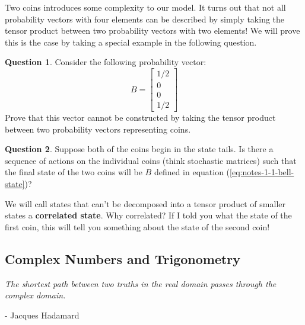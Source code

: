 \documentclass[letterpaper, 12pt]{article}
\newcommand{\1}{\mathds{1}}	%
\theoremstyle{definition}
\newtheorem{question}{Question}
\begin{document}
\newpage 
Two coins introduces some complexity to our model. It turns out that not all probability vectors with four elements can be described by simply taking the tensor product between two probability vectors with two elements! We will prove this is the case by taking a special example in the following question.  

\begin{question}
    Consider the following probability vector:
    \begin{equation}\label{eq:notes-1-1-bell-state}
        B = \begin{bmatrix}
            1/2 \\ 0 \\ 0 \\ 1/2
        \end{bmatrix}
    \end{equation}
    Prove that this vector cannot be constructed by taking the tensor product between two probability vectors representing coins. 
\end{question}
\vspace{50mm} %


\begin{question}
    Suppose both of the coins begin in the state tails. Is there a sequence of actions on the individual coins (think stochastic matrices) such that the final state of the two coins will be $B$ defined in equation (\ref{eq:notes-1-1-bell-state})? 
\end{question}
\vspace{50mm} %

We will call states that can't be decomposed into a tensor product of smaller states a \textbf{correlated state}. Why correlated? If I told you what the state of the first coin, this will tell you something about the state of the second coin! 



\newpage
\subsection{Complex Numbers and Trigonometry}

\textit{The shortest path between two truths in the real domain passes through the complex domain.} 

\small{- Jacques Hadamard}
\end{document}
